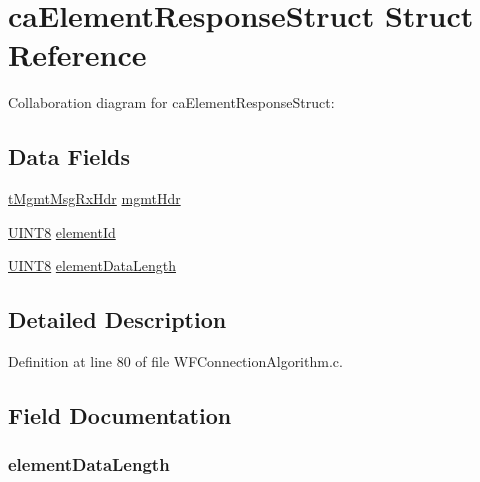 \hypertarget{structca_element_response_struct}{}\section{ca\+Element\+Response\+Struct Struct Reference}
\label{structca_element_response_struct}


Collaboration diagram for ca\+Element\+Response\+Struct\+:
\subsection*{Data Fields}
\begin{DoxyCompactItemize}
\item 
\hyperlink{_w_f_mgmt_msg_8h_aaec9ea808e7028d854dc40394ff6f6b5}{t\+Mgmt\+Msg\+Rx\+Hdr} \hyperlink{structca_element_response_struct_a7267478e6419a759f2c5eaa97eaacab7}{mgmt\+Hdr}
\item 
\hyperlink{_generic_type_defs_8h_ab27e9918b538ce9d8ca692479b375b6a}{U\+I\+N\+T8} \hyperlink{structca_element_response_struct_ae18351951739d45fe4aa49cb03e336c9}{element\+Id}
\item 
\hyperlink{_generic_type_defs_8h_ab27e9918b538ce9d8ca692479b375b6a}{U\+I\+N\+T8} \hyperlink{structca_element_response_struct_aea3027ceda8675b2b9d4341261c02814}{element\+Data\+Length}
\end{DoxyCompactItemize}


\subsection{Detailed Description}


Definition at line 80 of file W\+F\+Connection\+Algorithm.\+c.



\subsection{Field Documentation}
\hypertarget{structca_element_response_struct_aea3027ceda8675b2b9d4341261c02814}{}
\subsubsection[{element\+Data\+Length}]{ element\+Data\+Length}\label{structca_element_response_struct_aea3027ceda8675b2b9d4341261c02814}


